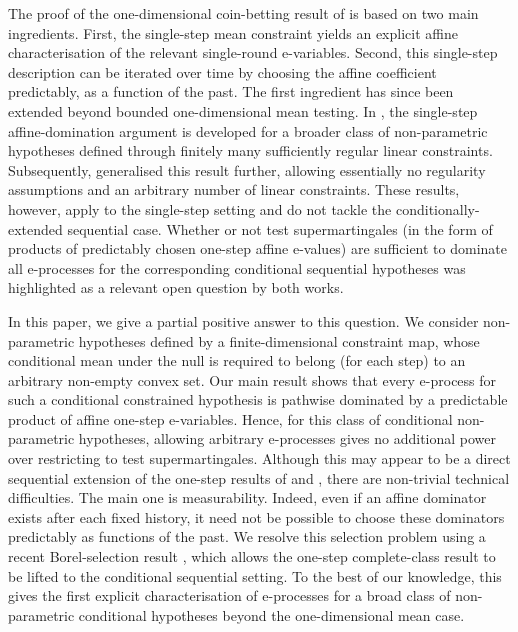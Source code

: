 \documentclass[10pt, a4paper]{article}
\begin{document}
The proof of the one-dimensional coin-betting result of \citet{clerico2025optimality} is based on two main ingredients. First, the single-step mean constraint yields an explicit affine characterisation of the relevant single-round e-variables. Second, this single-step description can be iterated over time by choosing the affine coefficient predictably, as a function of the past. The first ingredient has since been extended beyond bounded one-dimensional mean testing. In \citet{clerico2024optimal}, the single-step affine-domination argument is developed for a broader class of non-parametric hypotheses defined through finitely many sufficiently regular linear constraints. Subsequently, \citet{larsson2026testing} generalised this result further, allowing essentially no regularity assumptions and an arbitrary number of linear constraints. These results, however, apply to the single-step setting and do not tackle the conditionally-extended sequential case. Whether or not test supermartingales (in the form of products of predictably chosen one-step affine e-values) are sufficient to dominate all e-processes for the corresponding conditional sequential hypotheses was highlighted as a relevant open question by both works.

In this paper, we give a partial positive answer to this question. We consider non-parametric hypotheses defined by a finite-dimensional constraint map, whose conditional mean under the null is required to belong (for each step) to an arbitrary non-empty convex set. Our main result shows that every e-process for such a conditional constrained hypothesis is pathwise dominated by a predictable product of affine one-step e-variables. Hence, for this class of conditional non-parametric hypotheses, allowing arbitrary e-processes gives no additional power over restricting to test supermartingales. Although this may appear to be a direct sequential extension of the one-step results of \citet{clerico2024optimal} and \citet{larsson2026testing}, there are non-trivial technical difficulties. The main one is measurability. Indeed, even if an affine dominator exists after each fixed history, it need not be possible to choose these dominators predictably as functions of the past. We resolve this selection problem using a recent Borel-selection result \citep{clerico2026borel}, which allows the one-step complete-class result to be lifted to the conditional sequential setting. To the best of our knowledge, this gives the first explicit characterisation of e-processes for a broad class of non-parametric conditional hypotheses beyond the one-dimensional mean case.
\end{document}
